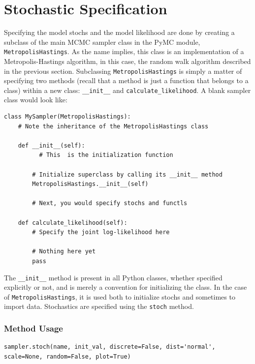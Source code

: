 \documentclass[]{book}
\begin{document}
\section{Stochastic Specification}\label{sec:stoch_specification}

Specifying the model stochs and the model likelihood are done by creating a subclass of the main MCMC sampler class in the PyMC module, \verb=MetropolisHastings=. As the name implies, this class is an implementation of a Metropolis-Hastings algorithm, in this case, the random walk algorithm described in the previous section. Subclassing \verb=MetropolisHastings= is simply a matter of specifying two methods (recall that a method is just a function that belongs to a class) within a new class: \verb=__init__= and \verb=calculate_likelihood=. A blank sampler class would look like:

\begin{verbatim}
class MySampler(MetropolisHastings):
    # Note the inheritance of the MetropolisHastings class

    def __init__(self):
          # This  is the initialization function

        # Initialize superclass by calling its __init__ method
        MetropolisHastings.__init__(self)

        # Next, you would specify stochs and functls

    def calculate_likelihood(self):
        # Specify the joint log-likelihood here

        # Nothing here yet
        pass

\end{verbatim}

The \verb=__init__= method is present in all Python classes, whether specified explicitly or not, and is merely a convention for initializing the class. In the case of \verb=MetropolisHastings=, it is used both to initialize stochs and sometimes to import data. Stochastics are specified using the \verb=stoch= method.

\subsubsection*{Method Usage}
\begin{verbatim}
sampler.stoch(name, init_val, discrete=False, dist='normal',
scale=None, random=False, plot=True)
\end{verbatim}
\end{document}
